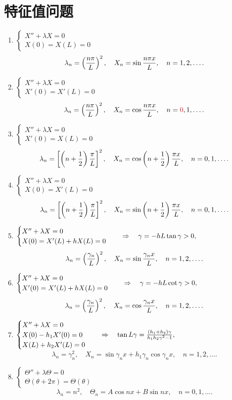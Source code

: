 \clearpage
\appendiks
\section{特征值问题}
\begin{enumerate}
	\item $\begin{cases}
		X''+\lambda X=0\\
		X(0)=X(L)=0
	\end{cases}$
	\[\lambda_n=\left(\frac{n\pi}L\right)^2,\quad X_n=\sin\frac{n\pi x}L,\quad n=1,2,\ldots.\]
	\item $\begin{cases}
		X''+\lambda X=0\\
		X'(0)=X'(L)=0
	\end{cases}$
	\[\lambda_n=\left(\frac{n\pi}L\right)^2,\quad X_n=\cos\frac{n\pi x}L,\quad n={\color{red}0},1,\ldots.\]
	\item $\begin{cases}
		X''+\lambda X=0\\
		X'(0)=X(L)=0
	\end{cases}$
	\[\lambda_n=\left[\left(n+\frac12\right)\frac{\pi}L\right]^2,\quad X_n=\cos\left(n+\frac12\right)\frac{\pi x}L,\quad n=0,1,\ldots.\]
	\item $\begin{cases}
		X''+\lambda X=0\\
		X(0)=X'(L)=0
	\end{cases}$
	\[\lambda_n=\left[\left(n+\frac12\right)\frac{\pi}L\right]^2,\quad X_n=\sin\left(n+\frac12\right)\frac{\pi x}L,\quad n=0,1,\ldots.\]
	\item $\begin{cases}
		X''+\lambda X=0\\
		X(0)=X'(L)+hX(L)=0
	\end{cases}\quad\Rightarrow\quad \gamma=-hL\tan\gamma>0,$
	\[\lambda_n=\left(\frac{\gamma_n}L\right)^2,\quad X_n=\sin\frac{\gamma_n x}L,\quad n=1,2,\ldots.\]
	\item $\begin{cases}
		X''+\lambda X=0\\
		X'(0)=X'(L)+hX(L)=0
	\end{cases}\quad\Rightarrow\quad \gamma=-hL\cot\gamma>0,$
	\[\lambda_n=\left(\frac{\gamma_n}L\right)^2,\quad X_n=\cos\frac{\gamma_n x}L,\quad n=1,2,\ldots.\]
	\item $\begin{cases}
		X''+\lambda X=0\\
		X(0)-h_1X'(0)=0\\
		X(L)+h_2X'(L)=0
	\end{cases}\quad\Rightarrow\quad\tan L\gamma=\frac{(h_1+h_2)\gamma}{h_1h_2\gamma^2-1},$
	\[\lambda_n=\gamma_n^2,\quad X_n=\sin\gamma_n x+h_1\gamma_n\cos\gamma_nx,\quad n=1,2,\ldots.\]
	\item $\begin{cases}
		\varTheta''+\lambda\varTheta=0\\
		\varTheta(\theta+2\pi)=\varTheta(\theta)
	\end{cases}$
	\[\lambda_n=n^2,\quad\varTheta_n=A\cos nx+B\sin nx,\quad n=0,1,\ldots.\]
\end{enumerate}
\clearpage
